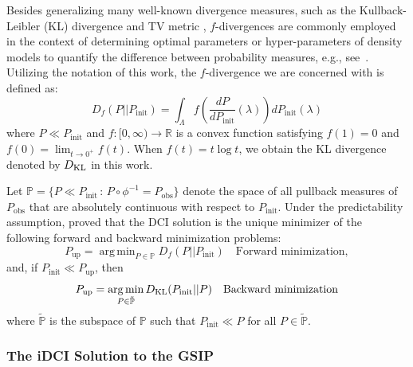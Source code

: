 \documentclass{article}
\newcommand{\p}{\mathbb{P}}
\newcommand{\pspace}{\Lambda}
\newcommand{\initmeas}{P_{\text{init}}}
\newcommand{\updatemeas}{P_{\text{up}}}
\newcommand{\obsmeas}{P_{\text{obs}}}
\DeclareMathOperator*{\argmin}{arg\,min}
\begin{document}
Besides generalizing many well-known divergence measures, such as the Kullback-Leibler (KL) divergence and TV metric \cite{KL1951, RenyiKL2014, BKM17, AH21}, $f$-divergences \cite{polyanskiy2022information} are commonly employed in the context of determining optimal parameters or hyper-parameters of density models to quantify the difference between probability measures, e.g., see~\cite{Guntuboyina2011, BKM17}.
Utilizing the notation of this work, the $f$-divergence we are concerned with is defined as:
\[
    D_{f}(P || P_\text{init}) = \int_\pspace f\left(\frac{dP}{dP_\text{init}}(\lambda)\right) dP_\text{init}(\lambda)
\]
where $P \ll P_\text{init}$ and \( f: [0, \infty) \to \mathbb{R} \) is a convex function satisfying \( f(1) = 0 \) and $f(0) = \lim_{t \rightarrow 0^{+}}f(t)$.
When $f(t)=t\log t$, we obtain the KL divergence denoted by $D_{\rm KL}$ in this work.

Let $\p = \{P\ll \initmeas\, : \, P\circ \phi^{-1} = \obsmeas\}$ denote the space of all pullback measures of $\obsmeas$ that are absolutely continuous with respect to $\initmeas$.
Under the predictability assumption, \cite{JBW+26} proved that the DCI solution is the unique minimizer of the following forward and backward minimization problems:
\[
    \updatemeas = \argmin_{P\in \p} D_{f}(P || \initmeas) \quad \text{Forward minimization},
\]
and, if $\initmeas \ll \updatemeas$, then
\[
    \updatemeas = \argmin_{P\in \tilde{\p}} D_{\rm KL}(\initmeas || P) \quad \text{Backward minimization}
\]
where $\tilde{\p}$ is the subspace of $\p$ such that $\initmeas \ll P$ for all $P\in\tilde{\p}$.

\subsubsection{The iDCI Solution to the GSIP}\label{subsec:iDCI+GSIP}
\end{document}
